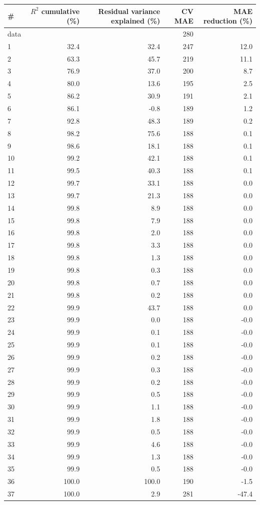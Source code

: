 \documentclass[11pt,a4paper]{article}
\begin{document}
\begin{center}
\begin{tabular}{lrrrr}
\toprule
\# & $R^2$ cumulative (\%) & Residual variance explained (\%) & CV MAE & MAE reduction (\%) \\
\midrule
data & & & 280 & \\
1 & 32.4 & 32.4 & 247 & 12.0 \\
2 & 63.3 & 45.7 & 219 & 11.1 \\
3 & 76.9 & 37.0 & 200 & 8.7 \\
4 & 80.0 & 13.6 & 195 & 2.5 \\
5 & 86.2 & 30.9 & 191 & 2.1 \\
6 & 86.1 & -0.8 & 189 & 1.2 \\
7 & 92.8 & 48.3 & 189 & 0.2 \\
8 & 98.2 & 75.6 & 188 & 0.1 \\
9 & 98.6 & 18.1 & 188 & 0.1 \\
10 & 99.2 & 42.1 & 188 & 0.1 \\
11 & 99.5 & 40.3 & 188 & 0.1 \\
12 & 99.7 & 33.1 & 188 & 0.0 \\
13 & 99.7 & 21.3 & 188 & 0.0 \\
14 & 99.8 & 8.9 & 188 & 0.0 \\
15 & 99.8 & 7.9 & 188 & 0.0 \\
16 & 99.8 & 2.0 & 188 & 0.0 \\
17 & 99.8 & 3.3 & 188 & 0.0 \\
18 & 99.8 & 1.3 & 188 & 0.0 \\
19 & 99.8 & 0.3 & 188 & 0.0 \\
20 & 99.8 & 0.7 & 188 & 0.0 \\
21 & 99.8 & 0.2 & 188 & 0.0 \\
22 & 99.9 & 43.7 & 188 & 0.0 \\
23 & 99.9 & 0.0 & 188 & -0.0 \\
24 & 99.9 & 0.1 & 188 & -0.0 \\
25 & 99.9 & 0.1 & 188 & -0.0 \\
26 & 99.9 & 0.2 & 188 & -0.0 \\
27 & 99.9 & 0.3 & 188 & -0.0 \\
28 & 99.9 & 0.2 & 188 & -0.0 \\
29 & 99.9 & 0.5 & 188 & -0.0 \\
30 & 99.9 & 1.1 & 188 & -0.0 \\
31 & 99.9 & 1.8 & 188 & -0.0 \\
32 & 99.9 & 0.5 & 188 & -0.0 \\
33 & 99.9 & 4.6 & 188 & -0.0 \\
34 & 99.9 & 1.3 & 188 & -0.0 \\
35 & 99.9 & 0.5 & 188 & -0.0 \\
36 & 100.0 & 100.0 & 190 & -1.5 \\
37 & 100.0 & 2.9 & 281 & -47.4 \\
\bottomrule
\end{tabular}
\end{center}
\end{document}
